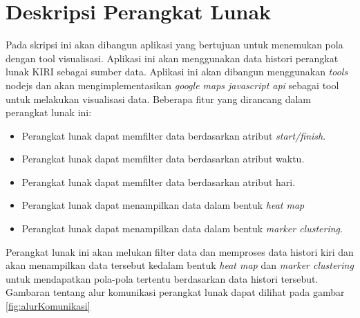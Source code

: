 


\section{Deskripsi Perangkat Lunak}
\label{sec:deskripsiPL}
Pada skripsi ini akan dibangun aplikasi yang bertujuan untuk menemukan pola dengan tool visualisasi. Aplikasi ini akan menggunakan data histori perangkat lunak KIRI sebagai sumber data. Aplikasi ini akan dibangun menggunakan \textit{tools} nodejs dan akan mengimplementasikan \textit{google maps javascript api} sebagai tool untuk melakukan visualisasi data. Beberapa fitur yang dirancang dalam perangkat lunak ini:
\begin{itemize}
\item Perangkat lunak dapat memfilter data berdasarkan atribut \textit{start/finish}.
\item Perangkat lunak dapat memfilter data berdasarkan atribut waktu.
\item Perangkat lunak dapat memfilter data berdasarkan atribut hari.
\item Perangkat lunak dapat menampilkan data dalam bentuk \textit{heat map}
\item Perangkat lunak dapat menampilkan data dalam bentuk \textit{marker clustering}.
\end{itemize}
Perangkat lunak ini akan melukan filter data dan memproses data histori kiri dan akan menampilkan data tersebut kedalam bentuk \textit{heat map} dan \textit{marker clustering} untuk mendapatkan pola-pola tertentu berdasarkan data histori tersebut. Gambaran tentang alur komunikasi perangkat lunak dapat dilihat pada gambar \ref{fig:alurKomunikasi}

